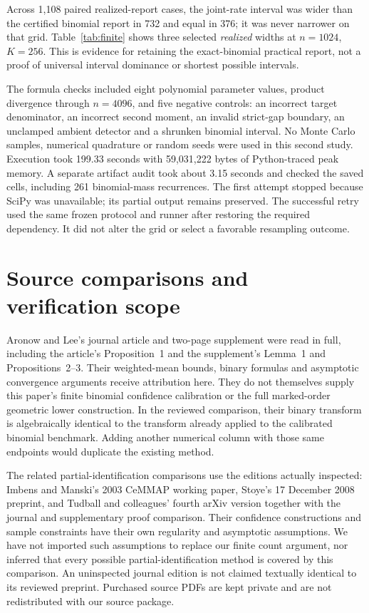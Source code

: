 \documentclass[11pt]{article}
\theoremstyle{remark}
\begin{document}
Across 1,108 paired realized-report cases, the joint-rate interval was
wider than the certified binomial report in 732 and equal in 376; it was
never narrower on that grid. Table~\ref{tab:finite} shows three selected
\emph{realized} widths at $n=1024$, $K=256$. This is evidence for retaining
the exact-binomial practical report, not a proof of universal interval
dominance or shortest possible intervals.


The formula checks included eight polynomial parameter values, product
divergence through $n=4096$, and five negative controls: an incorrect
target denominator, an incorrect second moment, an invalid strict-gap
boundary, an unclamped ambient detector and a shrunken binomial interval.
No Monte Carlo samples, numerical quadrature or random seeds were used in
this second study. Execution took 199.33 seconds with 59,031,222 bytes
of Python-traced peak memory. A separate artifact audit took about
3.15 seconds and checked the saved cells, including 261 binomial-mass
recurrences. The first attempt stopped because SciPy was unavailable;
its partial output remains preserved. The successful retry used the same
frozen protocol and runner after restoring the required dependency.
It did not alter the grid or select a favorable resampling outcome.

\section{Source comparisons and verification scope}\label{sec:verification}
Aronow and Lee's journal article and two-page supplement were read in
full, including the article's Proposition~1 and the supplement's Lemma~1
and Propositions~2--3. Their weighted-mean bounds, binary formulas and
asymptotic convergence arguments receive attribution here. They do not
themselves supply this paper's finite binomial confidence calibration or
the full marked-order geometric lower construction. In the reviewed
comparison, their binary transform is algebraically identical to the
transform already applied to the calibrated binomial benchmark. Adding
another numerical column with those same endpoints would duplicate the
existing method.

The related partial-identification comparisons use the editions actually
inspected: Imbens and Manski's 2003 CeMMAP working paper, Stoye's
17 December 2008 preprint, and Tudball and colleagues' fourth arXiv
version together with the journal and supplementary proof comparison.
Their confidence constructions and sample constraints have their own
regularity and asymptotic assumptions. We have not imported such
assumptions to replace our finite count argument, nor inferred that every
possible partial-identification method is covered by this comparison.
An uninspected journal edition is not claimed textually identical to its
reviewed preprint. Purchased source PDFs are kept private and are not
redistributed with our source package.
\end{document}
